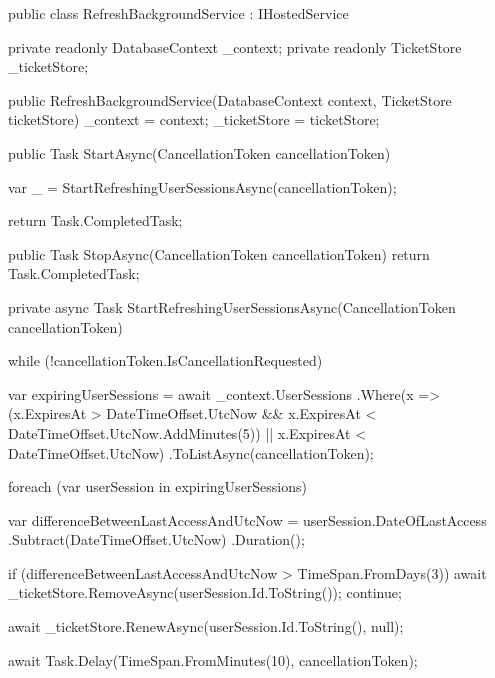 \begin{spverbatim}
    public class RefreshBackgroundService : IHostedService
        {
        private readonly DatabaseContext _context;
        private readonly TicketStore _ticketStore;

        public RefreshBackgroundService(DatabaseContext context, TicketStore ticketStore)
            {
            _context = context;
            _ticketStore = ticketStore;
        }

        public Task StartAsync(CancellationToken cancellationToken)
            {
            var _ = StartRefreshingUserSessionsAsync(cancellationToken);

            return Task.CompletedTask;
        }

        public Task StopAsync(CancellationToken cancellationToken)
            {
            return Task.CompletedTask;
        }

        private async Task StartRefreshingUserSessionsAsync(CancellationToken cancellationToken)
            {
            while (!cancellationToken.IsCancellationRequested)
                {
                var expiringUserSessions = await _context.UserSessions
                .Where(x => (x.ExpiresAt > DateTimeOffset.UtcNow &&
                x.ExpiresAt < DateTimeOffset.UtcNow.AddMinutes(5)) ||
                x.ExpiresAt < DateTimeOffset.UtcNow)
                .ToListAsync(cancellationToken);

                foreach (var userSession in expiringUserSessions)
                    {
                    var differenceBetweenLastAccessAndUtcNow = userSession.DateOfLastAccess
                    .Subtract(DateTimeOffset.UtcNow)
                    .Duration();

                    if (differenceBetweenLastAccessAndUtcNow > TimeSpan.FromDays(3))
                        {
                        await _ticketStore.RemoveAsync(userSession.Id.ToString());
                        continue;
                    }

                    await _ticketStore.RenewAsync(userSession.Id.ToString(), null);
                }

                await Task.Delay(TimeSpan.FromMinutes(10), cancellationToken);
            }
        }
    }
\end{spverbatim}